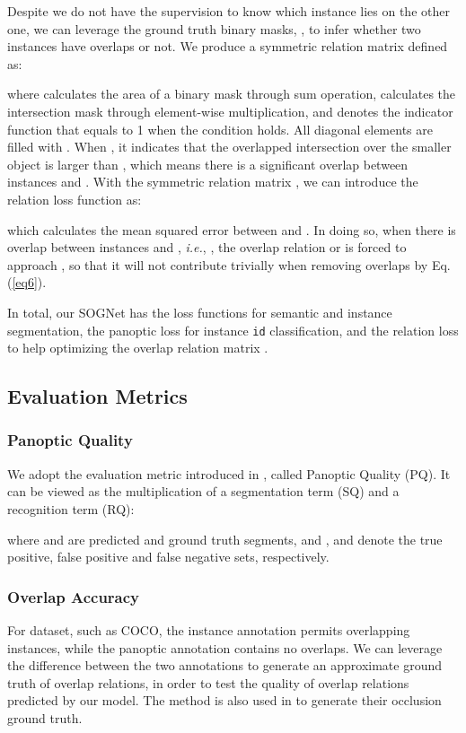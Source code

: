 \documentclass[letterpaper]{article} \usepackage{aaai20}  \usepackage{times}  \usepackage{helvet} \usepackage{courier}  \usepackage[hyphens]{url}  \usepackage{graphicx} \urlstyle{rm} \def\UrlFont{\rm}  \usepackage{graphicx}  \frenchspacing  \setlength{\pdfpagewidth}{8.5in}  \setlength{\pdfpageheight}{11in}
\begin{document}
Despite we do not have the supervision to know which instance lies on the other one, we can leverage the ground truth binary masks, , to infer whether two instances have overlaps or not. We produce a symmetric relation matrix  defined as:

where  calculates the area of a binary mask through sum operation,  calculates the intersection mask through element-wise multiplication, and  denotes the indicator function that equals to 1 when the condition holds. All diagonal elements  are filled with . When , it indicates that the overlapped intersection over the smaller object is larger than , which means there is a significant overlap between instances  and . With the symmetric relation matrix , we can introduce the relation loss function as:

which calculates the mean squared error between  and . In doing so, when there is overlap between instances  and , \emph{i.e.}, , the overlap relation  or  is forced to approach , so that it will not contribute trivially when removing overlaps by Eq. (\ref{eq6}). 

In total, our SOGNet has the loss functions for semantic and instance segmentation, the panoptic loss  for instance \verb|id| classification, and the relation loss  to help optimizing the overlap relation matrix . 

\subsection{Evaluation Metrics}

\subsubsection{Panoptic Quality}

We adopt the evaluation metric introduced in \cite{kirillov2018panoptic}, called Panoptic Quality (PQ). It can be viewed as the multiplication of a segmentation term (SQ) and a recognition term (RQ):

where  and  are predicted and ground truth segments, and ,  and  denote the true positive, false positive and false negative sets, respectively. 

\subsubsection{Overlap Accuracy}

For dataset, such as COCO, the instance annotation permits overlapping instances, while the panoptic annotation contains no overlaps. We can leverage the difference between the two annotations to generate an approximate ground truth of overlap relations, in order to test the quality of overlap relations predicted by our model. The method is also used in \cite{lazarow2019learning} to generate their occlusion ground truth. 
\end{document}
